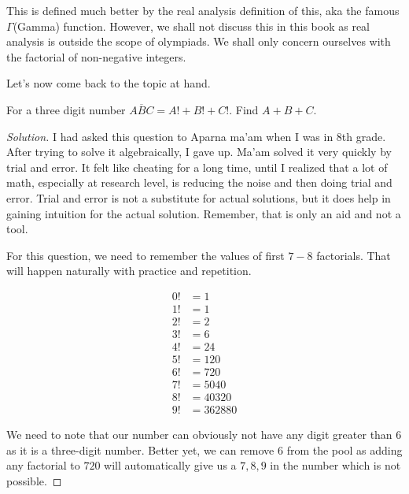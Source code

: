 This is defined much better by the real analysis definition of this, aka the famous \(\Gamma\)(Gamma) function. 
However, we shall not discuss this in this book as real analysis is outside the scope of
olympiads. We shall only concern ourselves with the factorial of non-negative integers.

Let's now come back to the topic at hand.

\begin{example}
For a three digit number \(\overline{ABC} = A!+B!+C!\). Find \(A+B+C\).
\end{example}

\begin{proof}
    [Solution]
    I had asked this question to Aparna ma'am when I was in 8th grade. After trying to solve it algebraically, 
    I gave up. Ma'am solved it very quickly by trial and error. It felt like cheating for a long time, 
    until I realized that a lot of math, especially at research level, is reducing the noise and then doing 
    trial and error. Trial and error is not a substitute for actual solutions, but it does
    help in gaining intuition for the actual solution. Remember, that is only an aid and not a tool.

    For this question, we need to remember the values of first \(7-8\) factorials. 
    That will happen naturally with practice and repetition.
    
    \begin{align*}
        0! &= 1\\
        1! &= 1 \\
        2! &= 2\\
        3! &= 6\\
        4! &= 24\\
        5! &= 120\\
        6! &= 720\\
        7! &= 5040\\
        8! &= 40320\\
        9! &= 362880
    \end{align*}

    We need to note that our number can obviously not have any digit greater than \(6\) as it is a
    three-digit number. Better yet, we can remove \(6\) from the pool as adding any factorial to \(720\) will 
    automatically give us a \(7,8,9\) in the number which is not possible.


\end{proof}
